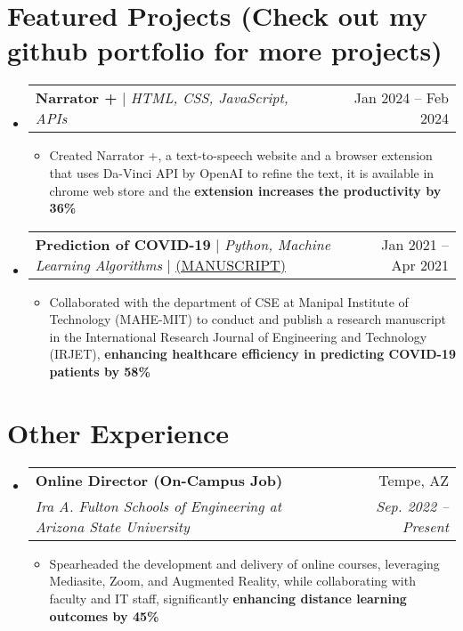 \documentclass[letterpaper,11pt]{article}
\makeatletter
\newcommand{\resumeItem}[1]{
  \item\small{
    {#1 \vspace{-2pt}}
  }
}
\newcommand{\resumeSubheading}[4]{
  \vspace{-2pt}\item
    \begin{tabular*}{0.97\textwidth}[t]{l@{\extracolsep{\fill}}r}
      \textbf{#1} & #2 \\
      \textit{\small#3} & \textit{\small #4} \\
    \end{tabular*}\vspace{-7pt}
}
\newcommand{\resumeProjectHeading}[2]{
    \item
    \begin{tabular*}{0.97\textwidth}{l@{\extracolsep{\fill}}r}
      \small#1 & #2 \\
    \end{tabular*}\vspace{-7pt}
}
\newcommand{\resumeSubHeadingListStart}{\begin{itemize}[leftmargin=0.15in, label={}]}
\newcommand{\resumeSubHeadingListEnd}{\end{itemize}}
\newcommand{\resumeItemListStart}{\begin{itemize}}
\newcommand{\resumeItemListEnd}{\end{itemize}\vspace{-5pt}}
\makeatother
\begin{document}
\section{Featured Projects (Check out my github portfolio for more projects)}
    \resumeSubHeadingListStart
      \resumeProjectHeading
          {\textbf{Narrator +} $|$ \emph{HTML, CSS, JavaScript, APIs}}{Jan 2024 -- Feb 2024}
          \resumeItemListStart
          \resumeItem{Created Narrator +, a text-to-speech website and a browser extension that uses Da-Vinci API by OpenAI to refine the text, it is available in chrome web store and the \textbf{extension increases the productivity by 36\%}}
\resumeItemListEnd

          \resumeProjectHeading
          {\textbf{Prediction of COVID-19 } $|$ \emph{Python, Machine Learning Algorithms} $|$ \href{https://www.irjet.net/archives/V8/i4/IRJET-V8I4825.pdf}{\underline{(MANUSCRIPT)}}}{Jan 2021 -- Apr 2021}
          \resumeItemListStart
            \resumeItem{Collaborated with the department of CSE at Manipal Institute of Technology (MAHE-MIT) to conduct and publish a research manuscript in the International Research Journal of Engineering and Technology (IRJET), \textbf{enhancing healthcare efficiency in predicting COVID-19 patients by 58\%}}
            
            
          \resumeItemListEnd

          

          

          

          
      
    \resumeSubHeadingListEnd

\section{Other Experience}
  \resumeSubHeadingListStart
    \resumeSubheading
      {Online Director (On-Campus Job)}{Tempe, AZ}
      {Ira A. Fulton Schools of Engineering at Arizona State University}{Sep. 2022 -- Present}
      \resumeItemListStart
        \resumeItem{Spearheaded the development and delivery of online courses, leveraging Mediasite, Zoom, and Augmented Reality, while collaborating with faculty and IT staff, significantly \textbf{enhancing distance learning outcomes by 45\%} }
        
      \resumeItemListEnd



      
\resumeSubHeadingListEnd

%



\end{document}
